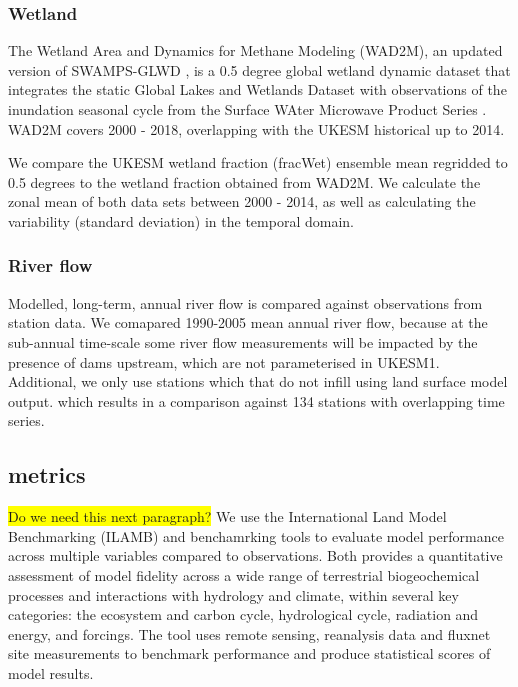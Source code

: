 \documentclass[bg, manuscript]{copernicus}
\newcommand{\hilight}[1]{\colorbox{yellow}{#1}}
\begin{document}
\subsubsection{Wetland}
The Wetland Area and Dynamics for Methane Modeling (WAD2M), an updated version of SWAMPS-GLWD \citep{Poulter2017-cx}, is a 0.5 degree global wetland dynamic dataset that integrates the static Global Lakes and Wetlands Dataset \citep{Lehner2004-rm} with observations of the inundation seasonal cycle from the Surface WAter Microwave Product Series \citep{Schroeder2015-ai}. WAD2M covers 2000 - 2018, overlapping with the UKESM historical up to 2014.

We compare the UKESM wetland fraction (fracWet) ensemble mean regridded to 0.5 degrees to the wetland fraction obtained from WAD2M. We calculate the zonal mean of both data sets between 2000 - 2014, as well as calculating the variability (standard deviation) in the temporal domain.


\subsubsection{River flow}
Modelled, long-term, annual river flow is compared against observations from \citet{Dai2009} station data. We comapared 1990-2005 mean annual river flow, because at the sub-annual time-scale some river flow measurements will be impacted by the presence of dams upstream, which are not parameterised in UKESM1. Additional, we only use stations which that do not infill using land surface model output. which results in a comparison against 134 stations with overlapping time series. 

\subsection{metrics}
\hilight{Do we need this next paragraph?}
We use the International Land Model Benchmarking (ILAMB) \citep{Collier2018-ai} and   \citet{Kelley2013-ey, rabin2017fire} benchamrking tools to evaluate model performance across multiple variables compared to observations. Both provides a quantitative assessment of model fidelity across a wide range of terrestrial biogeochemical processes and interactions with hydrology and climate, within several key categories: the ecosystem and carbon cycle, hydrological cycle, radiation and energy, and forcings. The tool uses remote sensing, reanalysis data and fluxnet site measurements to benchmark performance and produce statistical scores of model results. 
\end{document}
